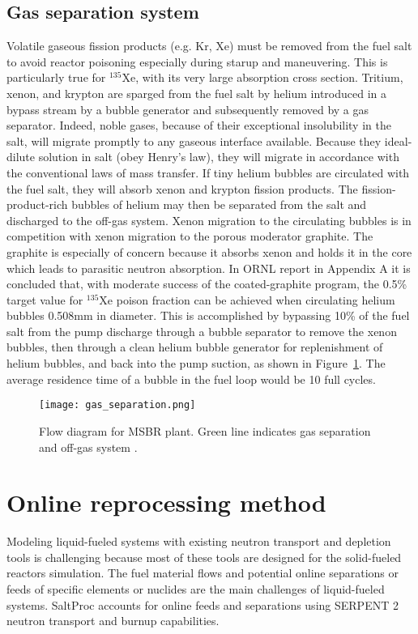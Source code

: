 \subsection{Gas separation system}
Volatile gaseous fission products (e.g. Kr, Xe) must be removed from the fuel salt to avoid reactor poisoning especially during starup and maneuvering. This is particularly true for $^{135}$Xe, with its very large absorption cross section. Tritium, xenon, and krypton are sparged from the fuel salt by helium introduced in a bypass stream by a bubble generator and subsequently removed by a gas separator. Indeed, noble gases, because of their exceptional insolubility in the salt, will migrate promptly to any gaseous interface available. Because they ideal-dilute solution in salt (obey Henry's law), they will migrate in accordance with the conventional laws of mass transfer. If tiny helium bubbles are circulated with the fuel salt, they will absorb xenon and krypton fission products. The fission-product-rich bubbles of helium may then be separated from the salt and discharged to the off-gas system. Xenon migration to the circulating bubbles is in competition with xenon migration to the porous moderator graphite. The graphite is especially of concern because it absorbs xenon and holds it in the core which leads to parasitic neutron absorption. In \gls{ORNL} report \cite{robertson_conceptual_1971} in Appendix A it is concluded that, with moderate success of the coated-graphite program, the 0.5\% target value for $^{135}$Xe poison fraction can be achieved when circulating helium bubbles 0.508mm in diameter. This is accomplished by bypassing 10\% of the fuel salt from
the pump discharge through a bubble separator to remove the xenon bubbles, then through a clean helium bubble generator for replenishment of helium bubbles, and back into the pump suction, as shown in Figure~\ref{fig:gas_removal_system}. The average residence time of a bubble in the fuel loop would be 10 full cycles.

\begin{figure}[htp!] %
  \centering
  \vspace{-0.3em}
  \texttt{[image: gas\_separation.png]}
  \caption{Flow diagram for \gls{MSBR} plant. Green line indicates gas separation and off-gas system \cite{robertson_conceptual_1971}.}
  \vspace{-0.6em}
  \label{fig:gas_removal_system}
\end{figure}
\FloatBarrier
\section{Online reprocessing method}
Modeling liquid-fueled systems with existing neutron transport and depletion tools is challenging because most of these tools are designed for the solid-fueled reactors simulation. The fuel material flows and potential online separations or feeds of specific elements or nuclides are the main challenges of liquid-fueled systems. SaltProc accounts for online feeds and separations using SERPENT 2 neutron transport and burnup capabilities.

